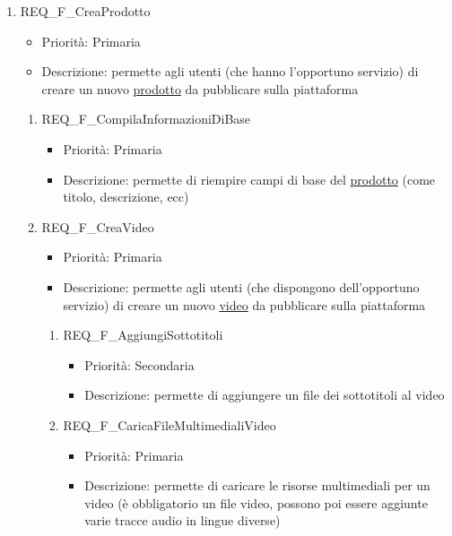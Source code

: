 \begin{enumerate}
	\item REQ\_F\_CreaProdotto
		\begin{itemize}
		\item Priorità: Primaria
		\item Descrizione: permette agli utenti (che hanno l'opportuno servizio) di creare un nuovo \hyperlink{AnReqProdMult}{prodotto} da pubblicare sulla piattaforma
		\end{itemize}
		\begin{enumerate}[label*=\arabic*.]
		\item REQ\_F\_CompilaInformazioniDiBase
			\begin{itemize}
			\item Priorità: Primaria
			\item Descrizione: permette di riempire campi di base del \hyperlink{AnReqProdMult}{prodotto} (come titolo, descrizione, ecc)
			\end{itemize}
		\item REQ\_F\_CreaVideo
			\begin{itemize}
			\item Priorità: Primaria
			\item Descrizione: permette agli utenti (che dispongono dell'opportuno servizio) di creare un nuovo \hyperlink{AnReqVideo}{video} da pubblicare sulla piattaforma
			\end{itemize}
			\begin{enumerate}[label*=\arabic*.]
			\item REQ\_F\_AggiungiSottotitoli
				\begin{itemize}
				\item Priorità: Secondaria
				\item Descrizione: permette di aggiungere un file dei sottotitoli al video
				\end{itemize}
			\item REQ\_F\_CaricaFileMultimedialiVideo
				\begin{itemize}
				\item Priorità: Primaria
				\item Descrizione: permette di caricare le risorse multimediali per un video (è obbligatorio un file video, possono poi essere aggiunte varie tracce audio in lingue diverse)
				\end{itemize}
			\end{enumerate}
	

\end{enumerate}
\end{enumerate}
